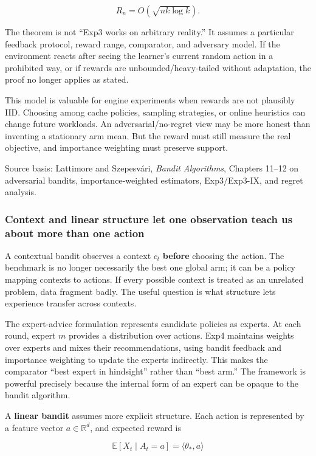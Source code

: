 \[
R_n=O(\sqrt{nk\log k}).
\]

The theorem is not ``Exp3 works on arbitrary reality.'' It assumes a particular feedback protocol, reward range, comparator, and adversary model. If the environment reacts after seeing the learner's current random action in a prohibited way, or if rewards are unbounded/heavy-tailed without adaptation, the proof no longer applies as stated.

This model is valuable for engine experiments when rewards are not plausibly IID. Choosing among cache policies, sampling strategies, or online heuristics can change future workloads. An adversarial/no-regret view may be more honest than inventing a stationary arm mean. But the reward must still measure the real objective, and importance weighting must preserve support.

Source basis: Lattimore and Szepesvári, \emph{Bandit Algorithms}, Chapters 11--12 on adversarial bandits, importance-weighted estimators, Exp3/Exp3-IX, and regret analysis.

\subsubsection{Context and linear structure let one observation teach us about more than one action}\label{context-and-linear-structure-let-one-observation-teach-us-about-more-than-one-action}

A contextual bandit observes a context \(c_t\) \textbf{before} choosing the action. The benchmark is no longer necessarily the best one global arm; it can be a policy mapping contexts to actions. If every possible context is treated as an unrelated problem, data fragment badly. The useful question is what structure lets experience transfer across contexts.

The expert-advice formulation represents candidate policies as experts. At each round, expert \(m\) provides a distribution over actions. Exp4 maintains weights over experts and mixes their recommendations, using bandit feedback and importance weighting to update the experts indirectly. This makes the comparator ``best expert in hindsight'' rather than ``best arm.'' The framework is powerful precisely because the internal form of an expert can be opaque to the bandit algorithm.

A \textbf{linear bandit} assumes more explicit structure. Each action is represented by a feature vector \(a\in\mathbb R^d\), and expected reward is

\[
\mathbb E[X_t\mid A_t=a]
=
\langle \theta_*,a\rangle
\]

